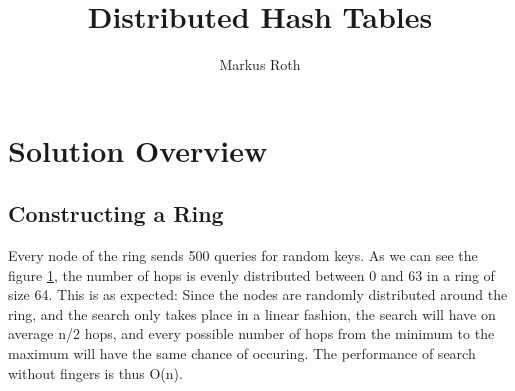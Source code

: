 \documentclass[a4paper]{article}
\title{Distributed Hash Tables}
\author{Markus Roth}
\begin{document}
\maketitle

\tableofcontents

\section{Solution Overview}

\subsection{Constructing a Ring}

\begin{figure}
    
    \label{fig:2-1}
\end{figure}

Every node of the ring sends 500 queries for random keys. As we can see the figure \ref{fig:2-1}, the number of hops is evenly distributed between 0 and 63 in a ring of size 64. This is as expected: Since the nodes are randomly distributed around the ring, and the search only takes place in a linear fashion, the search will have on average n/2 hops, and every possible number of hops from the minimum to the maximum will have the same chance of occuring. The performance of search without fingers is thus O(n).
\end{document}
